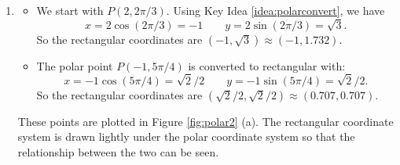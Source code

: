 {\begin{enumerate}
	\item \begin{itemize}
		\item 
	We start with $P(2,2\pi/3)$. Using Key Idea \ref{idea:polarconvert}, we have 
	$$x= 2\cos (2\pi/3) = -1\qquad y = 2\sin (2\pi/3) = \sqrt{3}.$$
	So the rectangular coordinates are $(-1,\sqrt{3}) \approx (-1,1.732)$.
	
	\item The polar point $P(-1,5\pi/4)$ is converted to rectangular with:
	$$x=-1\cos (5\pi/4) = \sqrt{2}/2\qquad y= -1\sin (5\pi/4) = \sqrt{2}/2.$$
	So the rectangular coordinates are $(\sqrt{2}/2,\sqrt{2}/2) \approx (0.707,0.707)$.
	\end{itemize}
	These points are plotted in Figure \ref{fig:polar2} (a). The rectangular coordinate system is drawn lightly under the polar coordinate system so that the relationship between the two can be seen.
	

\end{enumerate}}
